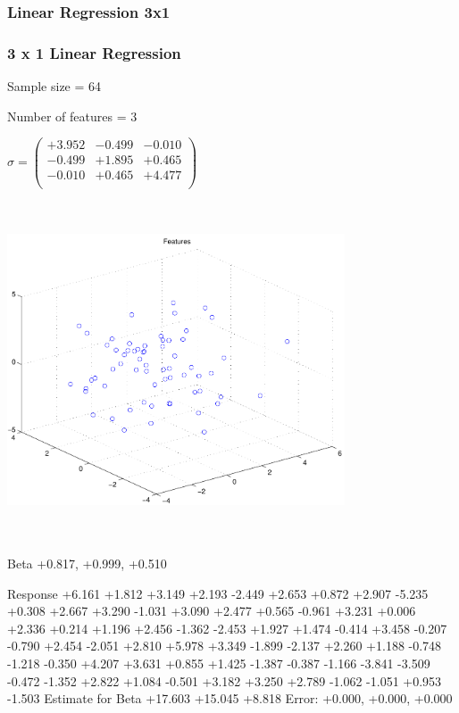 \documentclass[9pt]{article}
\theoremstyle{plain}
\theoremstyle{definition}
\theoremstyle{remark}
\numberwithin{equation}{section}
\begin{document}
\subsubsection{Linear Regression 3x1}
\subsubsection{3 x 1 Linear Regression}
Sample size = 64

Number of features = 3

$\sigma = \left(
\begin{array}{
ccc}
+3.952 & -0.499 & -0.010 \\
-0.499 & +1.895 & +0.465 \\
-0.010 & +0.465 & +4.477 \\
\end{array}
\right)$ \newline 

\includegraphics[width=10.0cm,height=10.0cm]{regression_features.pdf}

Beta
+0.817, +0.999, +0.510

Response
+6.161
+1.812
+3.149
+2.193
-2.449
+2.653
+0.872
+2.907
-5.235
+0.308
+2.667
+3.290
-1.031
+3.090
+2.477
+0.565
-0.961
+3.231
+0.006
+2.336
+0.214
+1.196
+2.456
-1.362
-2.453
+1.927
+1.474
-0.414
+3.458
-0.207
-0.790
+2.454
-2.051
+2.810
+5.978
+3.349
-1.899
-2.137
+2.260
+1.188
-0.748
-1.218
-0.350
+4.207
+3.631
+0.855
+1.425
-1.387
-0.387
-1.166
-3.841
-3.509
-0.472
-1.352
+2.822
+1.084
-0.501
+3.182
+3.250
+2.789
-1.062
-1.051
+0.953
-1.503
Estimate for Beta
+17.603
+15.045
+8.818
Error:
+0.000, +0.000, +0.000
\end{document}
